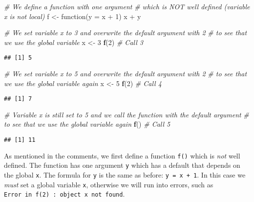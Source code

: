\documentclass[11,]{article}
\newenvironment{Shaded}{\begin{snugshade}}{\end{snugshade}}
\newcommand{\KeywordTok}[1]{\textcolor[rgb]{0.13,0.29,0.53}{\textbf{{#1}}}}
\newcommand{\DataTypeTok}[1]{\textcolor[rgb]{0.13,0.29,0.53}{{#1}}}
\newcommand{\DecValTok}[1]{\textcolor[rgb]{0.00,0.00,0.81}{{#1}}}
\newcommand{\StringTok}[1]{\textcolor[rgb]{0.31,0.60,0.02}{{#1}}}
\newcommand{\CommentTok}[1]{\textcolor[rgb]{0.56,0.35,0.01}{\textit{{#1}}}}
\newcommand{\NormalTok}[1]{{#1}}
\begin{document}
\begin{Shaded}
\begin{Highlighting}[]
\CommentTok{# We define a function with one argument}
\CommentTok{# which is NOT well defined (variable x is not local)}
\NormalTok{f <-}\StringTok{ }\NormalTok{function(}\DataTypeTok{y =} \NormalTok{x +}\StringTok{ }\DecValTok{1}\NormalTok{) x +}\StringTok{ }\NormalTok{y}

\CommentTok{# We set variable x to 3 and overwrite the default argument with 2}
\CommentTok{# to see that we use the global variable}
\NormalTok{x <-}\StringTok{ }\DecValTok{3}
\KeywordTok{f}\NormalTok{(}\DecValTok{2}\NormalTok{)  }\CommentTok{# Call 3}
\end{Highlighting}
\end{Shaded}

\begin{verbatim}
## [1] 5
\end{verbatim}

\begin{Shaded}
\begin{Highlighting}[]
\CommentTok{# We set variable x to 5 and overwrite the default argument with 2}
\CommentTok{# to see that we use the global variable again}
\NormalTok{x <-}\StringTok{ }\DecValTok{5}
\KeywordTok{f}\NormalTok{(}\DecValTok{2}\NormalTok{)  }\CommentTok{# Call 4}
\end{Highlighting}
\end{Shaded}

\begin{verbatim}
## [1] 7
\end{verbatim}

\begin{Shaded}
\begin{Highlighting}[]
\CommentTok{# Variable x is still set to 5 and we call the function with the default argument}
\CommentTok{# to see that we use the global variable again}
\KeywordTok{f}\NormalTok{()  }\CommentTok{# Call 5}
\end{Highlighting}
\end{Shaded}

\begin{verbatim}
## [1] 11
\end{verbatim}

As mentioned in the comments, we first define a function \texttt{f()}
which is \emph{not} well defined. The function has one argument
\texttt{y} which has a default that depends on the global \texttt{x}.
The formula for \texttt{y} is the same as before:
\texttt{y\ =\ x\ +\ 1}. In this case we \emph{must} set a global
variable \texttt{x}, otherwise we will run into errors, such as
\texttt{Error\ in\ f(2)\ :\ object\ \textquotesingle{}x\textquotesingle{}\ not\ found}.
\end{document}
